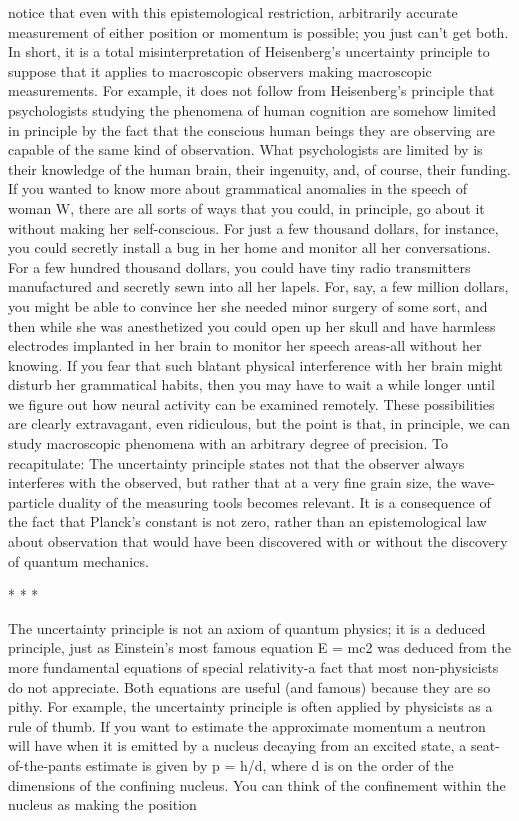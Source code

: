 notice that even with this epistemological restriction, arbitrarily accurate measurement
of either position or momentum is possible; you just can't get both.
        In short, it is a total misinterpretation of Heisenberg's uncertainty principle to
suppose that it applies to macroscopic observers making macroscopic measurements.
For example, it does not follow from Heisenberg's principle that psychologists
studying the phenomena of human cognition are somehow limited in principle by the
fact that the conscious human beings they are observing are capable of the same kind
of observation. What psychologists are limited by is their knowledge of the human
brain, their ingenuity, and, of course, their funding.
        If you wanted to know more about grammatical anomalies in the speech of
woman W, there are all sorts of ways that you could, in principle, go about it without
making her self-conscious. For just a few thousand dollars, for instance, you could
secretly install a bug in her home and monitor all her conversations. For a few
hundred thousand dollars, you could have tiny radio transmitters manufactured and
secretly sewn into all her lapels. For, say, a few million dollars, you might be able to
convince her she needed minor surgery of some sort, and then while she was
anesthetized you could open up her skull and have harmless electrodes implanted in
her brain to monitor her speech areas-all without her knowing. If you fear that such
blatant physical interference with her brain might disturb her grammatical habits, then
you may have to wait a while longer until we figure out how neural activity can be
examined remotely. These possibilities are clearly extravagant, even ridiculous, but
the point is that, in principle, we can study macroscopic phenomena with an arbitrary
degree of precision.
        To recapitulate: The uncertainty principle states not that the observer always
interferes with the observed, but rather that at a very fine grain size, the wave-particle
duality of the measuring tools becomes relevant. It is a consequence of the fact that
Planck's constant is not zero, rather than an epistemological law about observation
that would have been discovered with or without the discovery of quantum
mechanics.

                                        *   *   *

       The uncertainty principle is not an axiom of quantum physics; it is a deduced
principle, just as Einstein's most famous equation E = mc2 was deduced from the
more fundamental equations of special relativity-a fact that most non-physicists do
not appreciate. Both equations are useful (and famous) because they are so pithy. For
example, the uncertainty principle is often applied by physicists as a rule of thumb. If
you want to estimate the approximate momentum a neutron will have when it is
emitted by a nucleus decaying from an excited state, a seat-of-the-pants estimate is
given by p = h/d, where d is on the order of the dimensions of the confining nucleus.
You can think of the confinement within the nucleus as making the position




